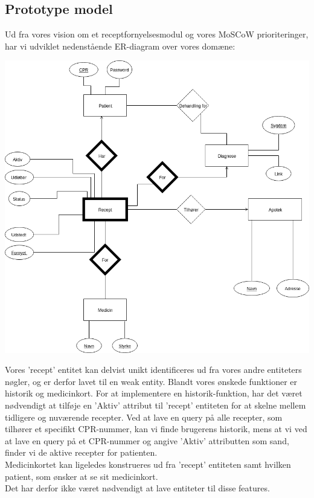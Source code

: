 \subsection{Prototype model}
Ud fra vores vision om et receptfornyelsesmodul og vores MoSCoW prioriteringer, har vi udviklet nedenstående ER-diagram over vores domæne:\\
\begin{center}
	\includegraphics[scale=0.48]{Materials/Prototype/NewERDiagram}
\end{center}
Vores 'recept' entitet kan delvist unikt identificeres ud fra vores andre entiteters nøgler, og er derfor lavet til en weak entity.
Blandt vores ønskede funktioner er historik og medicinkort. For at implementere en historik-funktion, har det været nødvendigt at tilføje en 'Aktiv' attribut til 'recept' entiteten for at skelne mellem tidligere og nuværende recepter. Ved at lave en query på alle recepter, som tilhører et specifikt CPR-nummer, kan vi finde brugerens historik, mens at vi ved at lave en query på et CPR-nummer og angive 'Aktiv' attributten som sand, finder vi de aktive recepter for patienten.\\
Medicinkortet kan ligeledes konstrueres ud fra 'recept' entiteten samt hvilken patient, som ønsker at se sit medicinkort.\\ 
Det har derfor ikke været nødvendigt at lave entiteter til disse features.\\

